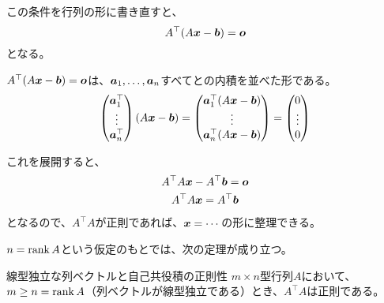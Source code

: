 \documentclass[../../../topic_linear-algebra]{subfiles}
\begin{document}
この条件を行列の形に書き直すと、
\begin{equation*}
  A^\top (A\vb*{x} - \vb*{b}) = \vb*{o}
\end{equation*}
となる。

\br

\begin{handout}
  $A^\top (A\vb*{x} - \vb*{b}) = \vb*{o}$は、$\vb*{a}_1, \ldots, \vb*{a}_n$すべてとの内積を並べた形である。
\begin{equation*}
  \begin{pmatrix}
    \vb*{a}_1^\top \\
    \vdots \\
    \vb*{a}_n^\top
  \end{pmatrix} (A\vb*{x} - \vb*{b})
  = \begin{pmatrix}
    \vb*{a}_1^\top (A\vb*{x} - \vb*{b}) \\
    \vdots \\
    \vb*{a}_n^\top (A\vb*{x} - \vb*{b})
  \end{pmatrix}
  = \begin{pmatrix}
    0 \\
    \vdots \\
    0
  \end{pmatrix}
\end{equation*}
\end{handout}

これを展開すると、
\begin{gather*}
  A^\top A \vb*{x} - A^\top \vb*{b} = \vb*{o} \\
  A^\top A \vb*{x} = A^\top \vb*{b}
\end{gather*}
となるので、$A^\top A$が正則であれば、$\vb*{x} = \cdots$の形に整理できる。

\br

$n = \rank A$という仮定のもとでは、次の定理が成り立つ。

\begin{theorem}{線型独立な列ベクトルと自己共役積の正則性}
  $m \times n$型行列$A$において、$m \geq n = \rank A$（列ベクトルが線型独立である）とき、$A^\top A$は正則である。
\end{theorem}
\end{document}

